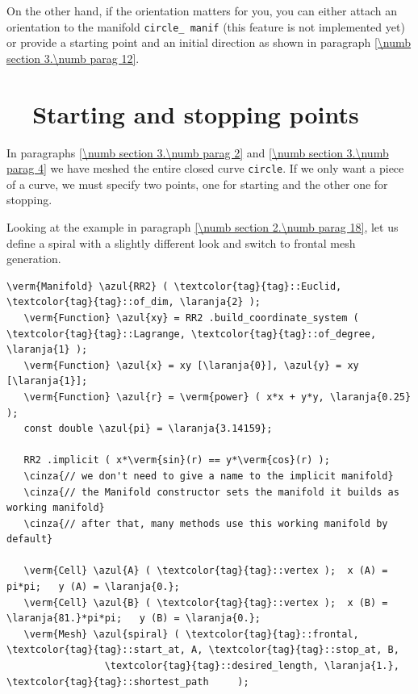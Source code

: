 On the other hand, if the orientation matters for you, you can either attach an orientation
to the manifold {\small\tt circle\_\,manif} (this feature is not implemented yet)
or provide a starting point and an initial direction as shown in paragraph
\ref{\numb section 3.\numb parag 12}.


\section{~~Starting and stopping points}\label{\numb section 3.\numb parag 5}

In paragraphs \ref{\numb section 3.\numb parag 2} and \ref{\numb section 3.\numb parag 4}
we have meshed the entire closed curve {\small\tt circle}.
If we only want a piece of a curve, we must specify two points, one for starting and
the other one for stopping.

Looking at the example in paragraph \ref{\numb section 2.\numb parag 18}, let us define a
spiral with a slightly different look and switch to frontal mesh generation.

\begin{Verbatim}[commandchars=\\\{\},formatcom=\small\tt,frame=single,
   label=parag-\ref{\numb section 3.\numb parag 5}.cpp,rulecolor=\color{moldura},
   baselinestretch=0.94,framesep=2mm                                            ]
   \verm{Manifold} \azul{RR2} ( \textcolor{tag}{tag}::Euclid, \textcolor{tag}{tag}::of_dim, \laranja{2} );
   \verm{Function} \azul{xy} = RR2 .build_coordinate_system ( \textcolor{tag}{tag}::Lagrange, \textcolor{tag}{tag}::of_degree, \laranja{1} );
   \verm{Function} \azul{x} = xy [\laranja{0}], \azul{y} = xy [\laranja{1}];
   \verm{Function} \azul{r} = \verm{power} ( x*x + y*y, \laranja{0.25} );
   const double \azul{pi} = \laranja{3.14159};
   
   RR2 .implicit ( x*\verm{sin}(r) == y*\verm{cos}(r) );
   \cinza{// we don't need to give a name to the implicit manifold}
   \cinza{// the Manifold constructor sets the manifold it builds as working manifold}
   \cinza{// after that, many methods use this working manifold by default}
   
   \verm{Cell} \azul{A} ( \textcolor{tag}{tag}::vertex );  x (A) =     pi*pi;   y (A) = \laranja{0.};
   \verm{Cell} \azul{B} ( \textcolor{tag}{tag}::vertex );  x (B) = \laranja{81.}*pi*pi;   y (B) = \laranja{0.};
   \verm{Mesh} \azul{spiral} ( \textcolor{tag}{tag}::frontal, \textcolor{tag}{tag}::start_at, A, \textcolor{tag}{tag}::stop_at, B,
                 \textcolor{tag}{tag}::desired_length, \laranja{1.}, \textcolor{tag}{tag}::shortest_path     );
\end{Verbatim}

